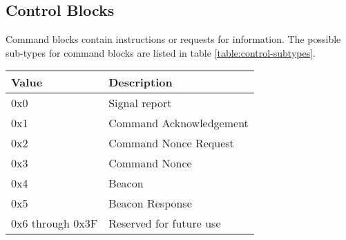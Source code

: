 \subsection{Control Blocks}
Command blocks contain instructions or requests for information. The possible sub-types for command blocks are listed
in table \ref{table:control-subtypes}.

\begin{table*}[htb]
    \centering
    \begin{tabular}{@{}ll@{}}
        \toprule
        Value            & Description             \\
        \midrule
        0x0              & Signal report           \\
        0x1              & Command Acknowledgement \\
        0x2              & Command Nonce Request   \\
        0x3              & Command Nonce           \\
        0x4              & Beacon                  \\
        0x5              & Beacon Response         \\
        0x6 through 0x3F & Reserved for future use \\
        \bottomrule
    \end{tabular}
    \caption{Control Block Subtypes}
    \label{table:control-subtypes}
\end{table*}



